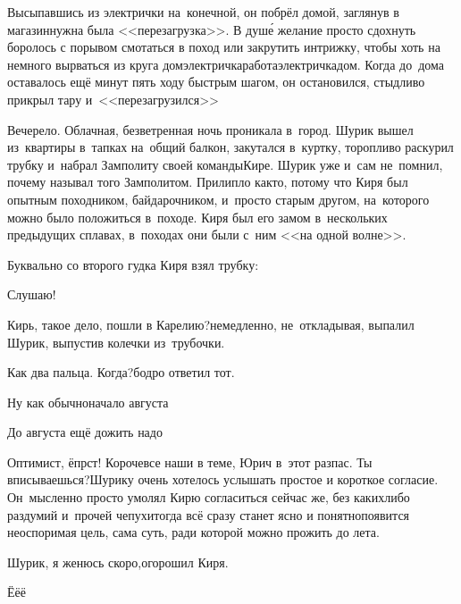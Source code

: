 {	Высыпавшись из электрички на~конечной, он побрёл домой, заглянув в магазин\mdash нужна была <<перезагрузка>>. В душ\'е желание просто сдохнуть боролось с порывом смотаться в поход или закрутить интрижку, чтобы хоть на немного вырваться из круга дом\nbdash электричка\nbdash работа\nbdash электричка\nbdash дом. Когда до~дома оставалось ещё минут пять ходу быстрым шагом, он остановился, стыдливо прикрыл тару и~<<перезагрузился>>\myldots{}
	
	
	\myldots{}Вечерело. Облачная, безветренная ночь проникала в~город.  Шурик вышел из~квартиры в~тапках на~общий балкон, закутался в~куртку, торопливо раскурил трубку и~набрал Замполиту своей команды\mdash Кире. Шурик уже и~сам не~помнил, почему называл того Замполитом. Прилипло как\sdash то, потому что Киря был опытным походником, байдарочником, и~просто старым другом, на~которого можно было положиться в~походе. Киря был его замом в~нескольких предыдущих сплавах, в~походах они были с~ним <<на одной волне>>.

	Буквально со второго гудка Киря взял трубку:
	
	\diagdash Слушаю!
	
	\diagdash Кирь, такое дело, пошли в Карелию?\mdash немедленно, не~откладывая, выпалил Шурик, выпустив колечки из~трубочки.
	
	\diagdash Как два пальца. Когда?\mdash бодро ответил тот.
	
	\diagdash Ну как обычно\mdash начало августа\myldots{}
	
	\diagdash До августа ещё дожить надо\myldots{}
	
	\diagdash Оптимист, ёпрст! Короче\mdash все наши в теме, Юрич в~этот раз\mdash пас. Ты вписываешься?\mdash Шурику очень хотелось услышать простое и короткое согласие. Он~мысленно просто умолял Кирю согласиться сейчас же, без каких\sdash либо раздумий и~прочей чепухи\mdash тогда всё сразу станет ясно и понятно\mdash появится неоспоримая цель, сама суть, ради которой можно прожить до лета.
	
	\diagdash Шурик, я женюсь скоро,\mdash огорошил Киря.
	
	\diagdash Ё\sdash ё\sdash ё\myldots{}
	
}
